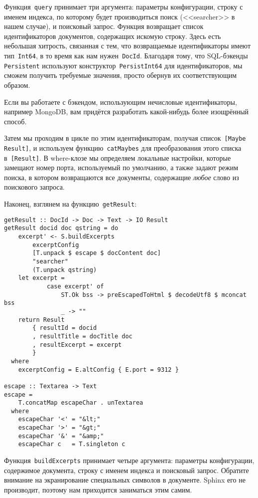 Функция~\lstinline'query' принимает три аргумента: параметры конфигурации,
строку с именем индекса, по которому будет производиться поиск (<<searcher>> в
нашем случае), и поисковый запрос. Функция возвращает список идентификаторов
документов, содержащих искомую строку. Здесь есть небольшая хитрость, связанная
с тем, что возвращаемые идентификаторы имеют тип~\lstinline'Int64', в то время
как нам нужен~\lstinline'DocId'. Благодаря тому, что SQL-бэкенды
\lstinline'Persistent' используют конструктор~\lstinline'PersistInt64' для
идентификаторов, мы сможем получить требуемые значения, просто обернув их
соответствующим образом.

\begin{remark}
    Если вы работаете с бэкендом, использующим нечисловые идентификаторы,
    например MongoDB, вам придётся разработать какой-нибудь более изощрённый
    способ.
\end{remark}

Затем мы проходим в цикле по этим идентификаторам, получая
список~\lstinline'[Maybe Result]', и используем функцию~\lstinline'catMaybes'
для преобразования этого списка в~\lstinline'[Result]'. В where-клозе мы
определяем локальные настройки, которые замещают номер порта, используемый по
умолчанию, а также задают режим поиска, в котором возвращаются все документы,
содержащие \emph{любое} слово из поискового запроса.

Наконец, взглянем на функцию~\lstinline'getResult':
\begin{lstlisting}
getResult :: DocId -> Doc -> Text -> IO Result
getResult docid doc qstring = do
    excerpt' <- S.buildExcerpts
        excerptConfig
        [T.unpack $ escape $ docContent doc]
        "searcher"
        (T.unpack qstring)
    let excerpt =
            case excerpt' of
                ST.Ok bss -> preEscapedToHtml $ decodeUtf8 $ mconcat bss
                _ -> ""
    return Result
        { resultId = docid
        , resultTitle = docTitle doc
        , resultExcerpt = excerpt
        }
  where
    excerptConfig = E.altConfig { E.port = 9312 }

escape :: Textarea -> Text
escape =
    T.concatMap escapeChar . unTextarea
  where
    escapeChar '<' = "&lt;"
    escapeChar '>' = "&gt;"
    escapeChar '&' = "&amp;"
    escapeChar c   = T.singleton c
\end{lstlisting}

Функция~\lstinline'buildExcerpts' принимает четыре аргумента: параметры
конфигурации, содержимое документа, строку с именем индекса и поисковый запрос.
Обратите внимание на экранирование специальных символов в документе. Sphinx его
не производит, поэтому нам приходится заниматься этим самим.

